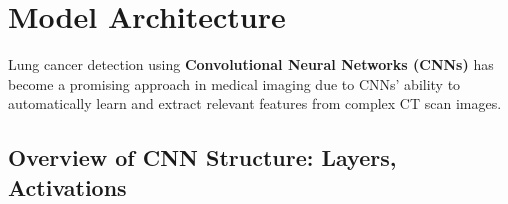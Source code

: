 
\section{Model Architecture}

Lung cancer detection using \textbf{Convolutional Neural Networks (CNNs)} has become a promising 
approach in medical imaging due to CNNs’ ability to automatically learn and extract relevant 
features from complex CT scan images.


\subsection{Overview of CNN Structure: Layers, Activations}

